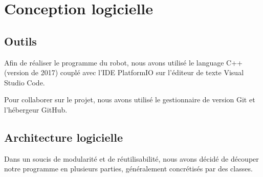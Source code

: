 \section{Conception logicielle}

\subsection{Outils}

Afin de réaliser le programme du robot, nous avons utilisé le language C++ (version de 2017) couplé avec l'IDE PlatformIO sur l'éditeur de texte Visual Studio Code.

Pour collaborer sur le projet, nous avons utilisé le gestionnaire de version Git et l'hébergeur GitHub.

\subsection{Architecture logicielle}

Dans un soucis de modularité et de réutilisabilité, nous avons décidé de découper notre programme en plusieurs parties, généralement concrétisés par des classes.
